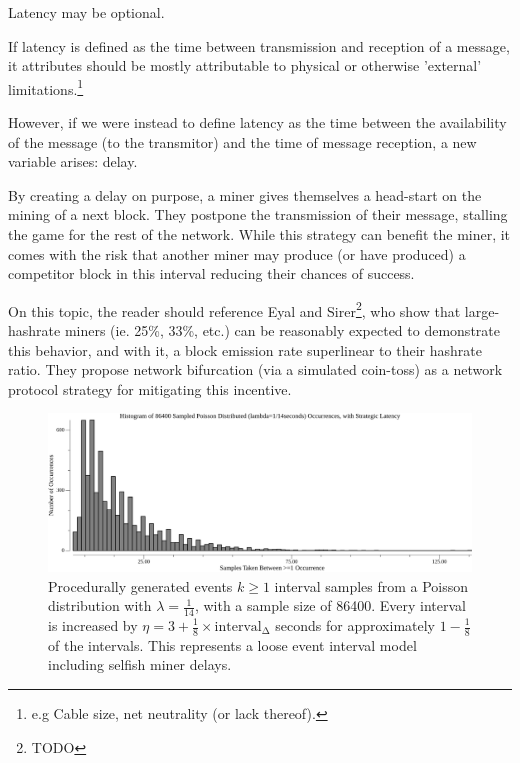 \documentclass[11pt]{article}
\begin{document}
	\vspace{5mm}
	\begin{proposition}
		Latency may be optional.
	\end{proposition}

	If latency is defined as the time between transmission and reception of a
	message, it attributes should be mostly attributable to physical or
	otherwise 'external' limitations.\nolinebreak\footnote{
		e.g Cable size, net neutrality (or lack thereof).
	}

	However, if we were instead to define latency as the time between the availability
	of the message (to the transmitor) and the time of message reception,
	a new variable arises: delay.

	By creating a delay on purpose, a miner gives themselves a head-start
	on the mining of a next block. They postpone the transmission of their message,
	stalling the game for the rest of the network. While this strategy can benefit
	the miner, it comes with the risk that another miner may produce (or have
	produced) a competitor block in this interval reducing their chances of success.

	On this topic, the reader should reference Eyal and Sirer\footnote{TODO}, who
	show that large-hashrate miners (ie. 25\%, 33\%, etc.) can be reasonably
	expected to demonstrate this behavior, and with it, a block emission
	rate superlinear to their hashrate ratio. They propose network bifurcation
	(via a simulated coin-toss) as a network protocol strategy for mitigating
	this incentive.

	\begin{figure}[tph]
		\centering

		\includegraphics[width=1.0\textwidth]{go-block-step/out/vis_poisson_samples_eventintervals_latencysamesamestrat_hist.png}
		\caption{
			Procedurally generated events $k \geq 1$ interval samples from a Poisson distribution
			with $\lambda = \frac{1}{14}$, with a sample size of 86400.
			Every interval is increased by $\eta=3 + \frac{1}{8} \times \mathrm{interval_{\Delta}}$ seconds for approximately
			$1-\frac{1}{8}$ of the intervals.
			This represents a loose event interval model including selfish miner delays.
		}
	\end{figure}


%
%
\end{document}
